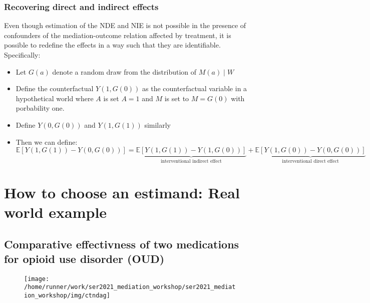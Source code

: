 \documentclass[
  12pt, krantz2,
]{book}
\providecommand{\tightlist}{%
  \setlength{\itemsep}{0pt}\setlength{\parskip}{0pt}}
\theoremstyle{definition}
\theoremstyle{definition}
\theoremstyle{definition}
\newcommand{\E}{\mathbb{E}}
\newcommand{\1}{\mathbbm{1}}
\begin{document}
\hypertarget{recovering-direct-and-indirect-effects}{%
\subsection{Recovering direct and indirect effects}\label{recovering-direct-and-indirect-effects}}

Even though estimation of the NDE and NIE is not possible in the
presence of confounders of the mediation-outcome relation affected by
treatment, it is possible to redefine the effects in a way such that
they are identifiable. Specifically:

\begin{itemize}
\tightlist
\item
  Let \(G(a)\) denote a random draw from the distribution of \(M(a) \mid W\)
\item
  Define the counterfactual \(Y(1,G(0))\) as the counterfactual
  variable in a hypothetical world where \(A\) is set \(A=1\) and \(M\) is
  set to \(M=G(0)\) with porbability one.
\item
  Define \(Y(0,G(0))\) and \(Y(1,G(1))\) similarly
\item
  Then we can define:
  \[\E[Y(1,G(1)) - Y(0,G(0))]=\underbrace{\E[Y(1,G(1))-Y(1,G(0))]}_{\text{interventional indirect effect}}+\underbrace{\E[Y(1,G(0))-Y(0,G(0))]}_{\text{interventional direct effect}}\]
\end{itemize}

\hypertarget{estimandirl}{%
\chapter{How to choose an estimand: Real world example}\label{estimandirl}}

\hypertarget{comparative-effectivness-of-two-medications-for-opioid-use-disorder-oud}{%
\section{Comparative effectivness of two medications for opioid use disorder (OUD)}\label{comparative-effectivness-of-two-medications-for-opioid-use-disorder-oud}}

\begin{figure}

{\centering \texttt{[image: /home/runner/work/ser2021\_mediation\_workshop/ser2021\_mediation\_workshop/img/ctndag]} 

}

\end{figure}
\end{document}
